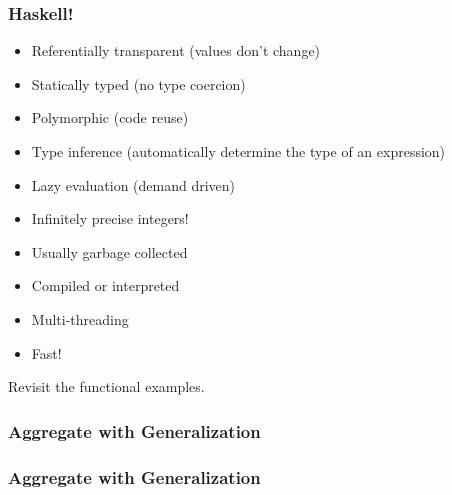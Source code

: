 \begin{frame}
  \frametitle{Haskell!}
  \pause
  \begin{itemize}[<+->]
    \item Referentially transparent (values don't change)
    \item Statically typed (no type coercion)
    \item Polymorphic (code reuse)
    \item Type inference (automatically determine the type of an expression)
    \item Lazy evaluation (demand driven)
    \item Infinitely precise integers!
    \item Usually garbage collected
    \item Compiled or interpreted
    \item Multi-threading
    \item Fast!
  \end{itemize}
\end{frame}



\begin{frame}
  Revisit the functional examples.
\end{frame}

\begin{frame}[fragile]
  \frametitle{Aggregate with Generalization}
  \pause
  
\end{frame}

\begin{frame}[fragile]
  \frametitle{Aggregate with Generalization}
  \pause
  
\end{frame}

